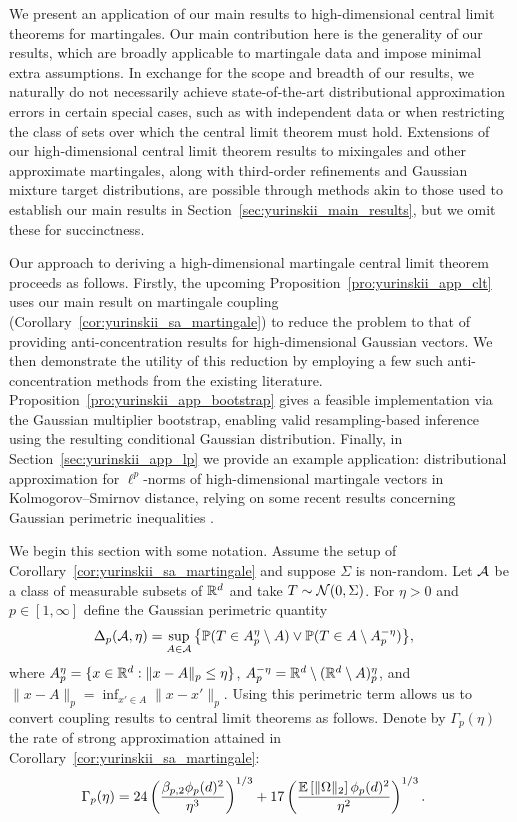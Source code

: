 We present an application of our main results to
high-dimensional central limit theorems for martingales. Our main
contribution here is the generality of our results, which are broadly
applicable to martingale data and impose minimal extra assumptions. In exchange
for the scope and breadth of our results, we naturally do not necessarily
achieve state-of-the-art distributional approximation errors in certain special
cases, such as with independent data or when restricting the class of sets over
which the central limit theorem must hold. Extensions of our high-dimensional
central limit theorem results to mixingales and other approximate martingales,
along with third-order refinements and Gaussian mixture target distributions,
are possible through methods akin to those used to establish our main results
in Section~\ref{sec:yurinskii_main_results}, but we omit these for succinctness.

Our approach to deriving a high-dimensional martingale central limit theorem
proceeds as follows. Firstly, the upcoming
Proposition~\ref{pro:yurinskii_app_clt} uses our
main result on martingale coupling
(Corollary~\ref{cor:yurinskii_sa_martingale}) to
reduce the problem to that of providing anti-concentration results for
high-dimensional Gaussian vectors. We then demonstrate the utility of this
reduction by employing a few such anti-concentration methods from the existing
literature. Proposition~\ref{pro:yurinskii_app_bootstrap} gives a feasible
implementation via
the Gaussian multiplier bootstrap, enabling valid
resampling-based inference using
the resulting conditional Gaussian distribution. Finally, in
Section~\ref{sec:yurinskii_app_lp} we provide an example application:
distributional
approximation for $\ell^p$-norms of high-dimensional martingale vectors
in Kolmogorov--Smirnov distance, relying on some recent results
concerning Gaussian perimetric inequalities
\citep{nazarov2003maximal,kozbur2021dimension,
giessing2023anti,chernozhukov2017detailed}.

We begin this section with some notation. Assume the setup of
Corollary~\ref{cor:yurinskii_sa_martingale} and suppose $\Sigma$ is
non-random. Let $\mathcal{A}$ be a class of measurable subsets of
$\mathbb{R}^d$ and take $T \sim \mathcal{N}(0, \Sigma)$.
For $\eta>0$ and $p \in [1, \infty]$ define the Gaussian perimetric quantity
%
\begin{align*}
  \Delta_p(\mathcal{A}, \eta)
  &=
  \sup_{A\in \mathcal{A}}
  \big\{\mathbb{P}(T\in A_p^\eta\setminus A)
  \vee \mathbb{P}(T\in A \setminus A_p^{-\eta})\big\},
\end{align*}
%
where $A_p^\eta = \{x \in \mathbb{R}^d : \|x - A\|_p \leq \eta\}$,
$A_p^{-\eta} = \mathbb{R}^d \setminus (\mathbb{R}^d \setminus A)_p^\eta$,
and $\|x - A\|_p = \inf_{x' \in A} \|x - x'\|_p$.
Using this perimetric term allows us to convert coupling results
to central limit theorems as follows.
Denote by $\Gamma_p(\eta)$ the rate of strong approximation attained in
Corollary~\ref{cor:yurinskii_sa_martingale}:
%
\begin{align*}
  \Gamma_p(\eta)
  &=
  24 \left(
    \frac{\beta_{p,2} \phi_p(d)^2}{\eta^3}
  \right)^{1/3}
  + 17 \left(
    \frac{\mathbb{E} \left[ \|\Omega\|_2 \right] \phi_p(d)^2}{\eta^2}
  \right)^{1/3}.
\end{align*}

